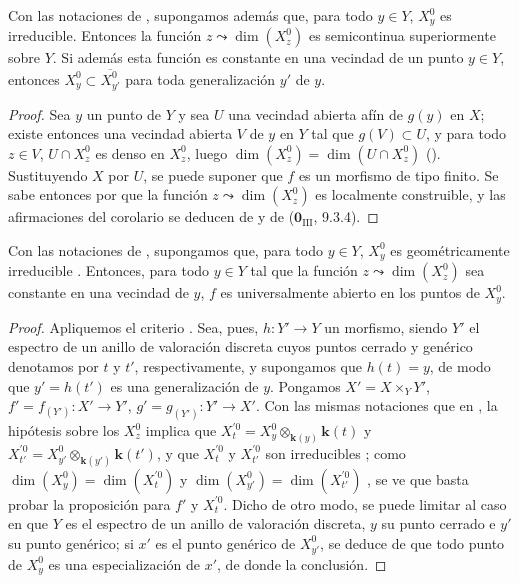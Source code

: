 \begin{corollary}[15.6.2]
\label{IV.15.6.2}
Con las notaciones de , supongamos además que, para todo $y\in Y$, $X_y^0$ es irreducible.
Entonces la función $z\leadsto\dim(X_z^0)$ es semicontinua superiormente sobre $Y$.
Si además esta función es constante en una vecindad de un punto $y\in Y$, entonces $X_y^0\subset\overline{X_{y'}^0}$ para toda generalización $y'$ de $y$.
\end{corollary}

\begin{proof}
Sea $y$ un punto de $Y$ y sea $U$ una vecindad abierta afín de $g(y)$ en $X$; existe entonces una vecindad abierta $V$ de $y$ en $Y$ tal que $g(V)\subset U$, y para todo $z\in V$, $U\cap X_z^0$ es denso en $X_z^0$, luego $\dim(X_z^0)=\dim(U\cap X_z^0)$ ().
Sustituyendo $X$ por $U$, se puede suponer que $f$ es un morfismo de tipo finito.
Se sabe entonces por  que la función $z\leadsto\dim(X_z^0)$ es localmente construible, y las afirmaciones del corolario se deducen de  y de ($\mathbf{0}_{\mathrm{III}}$, 9.3.4).
\end{proof}

\begin{proposition}[15.6.3]
\label{IV.15.6.3}
Con las notaciones de , supongamos que, para todo $y\in Y$, $X_y^0$ es geométricamente irreducible .
Entonces, para todo $y\in Y$ tal que la función $z\leadsto\dim(X_z^0)$ sea constante en una vecindad de $y$, $f$ es universalmente abierto en los puntos de $X_y^0$.
\end{proposition}

\begin{proof}
Apliquemos el criterio .
Sea, pues, $h:Y'\to Y$ un morfismo, siendo $Y'$ el espectro de un anillo de valoración discreta cuyos puntos cerrado y genérico denotamos por $t$ y $t'$, respectivamente, y supongamos que $h(t)=y$, de modo que $y'=h(t')$ es una generalización de $y$.
Pongamos $X'=X\times_Y Y'$, $f'=f_{(Y')}:X'\to Y'$, $g'=g_{(Y')}:Y'\to X'$.
Con las mismas notaciones que en , la hipótesis sobre los $X_z^0$ implica que $X_t^{\prime 0}=X_y^0\otimes_{\mathbf{k}(y)}\boldsymbol{k}(t)$ y $X_{t'}^{\prime 0}=X_{y'}^0\otimes_{\mathbf{k}(y')}\boldsymbol{k}(t')$, y que $X_t^{\prime 0}$ y $X_{t'}^{\prime 0}$ son irreducibles ; como $\dim(X_y^0)=\dim(X_t^{\prime 0})$ y $\dim(X_{y'}^0)=\dim(X_{t'}^{\prime 0})$ , se ve que basta probar la proposición para $f'$ y $X_t^{\prime 0}$. Dicho de otro modo, se puede limitar al caso en que $Y$ es el espectro de un anillo de valoración discreta, $y$ su punto cerrado e $y'$ su punto genérico; si $x'$ es el punto genérico de $X_{y'}^0$, se deduce de  que todo punto de $X_y^0$ es una especialización de $x'$, de donde la conclusión.
\end{proof}

